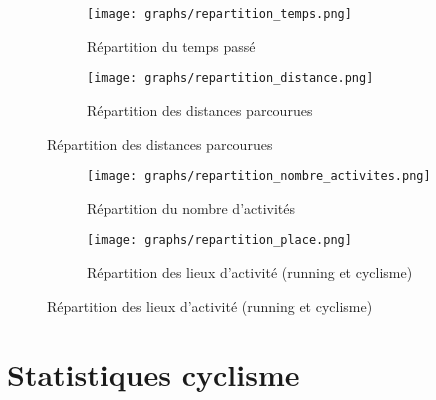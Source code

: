 \documentclass[a4paper,french,11pt]{report}
\begin{document}
\begin{figure}[!ht]
\begin{subfigure}{.49\linewidth}

\centering

\texttt{[image: graphs/repartition\_temps.png]}
\caption*{Répartition du temps passé}

\end{subfigure}\hfill
\begin{subfigure}{.49\linewidth}

\centering

\texttt{[image: graphs/repartition\_distance.png]}
\caption*{Répartition des distances parcourues}

\end{subfigure}

\end{figure}


\begin{figure}[!ht]
\begin{subfigure}{.49\linewidth}

\centering

\texttt{[image: graphs/repartition\_nombre\_activites.png]}
\caption*{Répartition du nombre d'activités}

\end{subfigure}\hfill
\begin{subfigure}{.49\linewidth}

\centering

\texttt{[image: graphs/repartition\_place.png]}
\caption*{Répartition des lieux d'activité (running et cyclisme)}

\end{subfigure}

\end{figure}

\newpage


\section*{Statistiques cyclisme}
\thispagestyle{empty}
\end{document}
